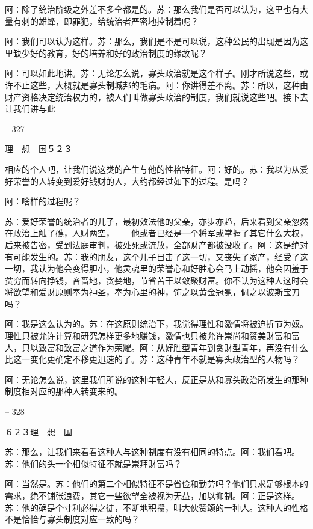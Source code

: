 \documentclass[11pt,oneside]{book}
\begin{document}
\begin{common-format}
    阿：除了统治阶级之外差不多全都是的。苏：那么我们是否可以认为，这里也有大量有刺的雄蜂，即罪犯，给统治者严密地控制着呢？

    阿：我们可以认为这样。苏：那么，我们是不是可以说，这种公民的出现是因为这里缺少好的教育，好的培养和好的政治制度的缘故呢？

    阿：可以如此地讲。苏：无论怎么说，寡头政治就是这个样子。刚才所说这些，或许不止这些，大概就是寡头制城邦的毛病。阿：你讲得差不离。苏：所以，这种由财产资格决定统治权力的，被人们叫做寡头政治的制度，我们就说这些吧。接下去让我们讲与此

    

-- 327

    理　想　国５２３

    相应的个人吧，让我们说这类的产生与他的性格特征。阿：好的。苏：我以为从爱好荣誉的人转变到爱好钱财的人，大约都经过如下的过程。是吗？

    阿：啥样的过程呢？

    苏：爱好荣誉的统治者的儿子，最初效法他的父亲，亦步亦趋，后来看到父亲忽然在政治上触了礁，人财两空，——他或者已经是一个将军或掌握了其它什么大权，后来被告密，受到法庭审判，被处死或流放，全部财产都被没收了。阿：这是绝对有可能发生的。苏：我的朋友，这个儿子目击了这一切，又丧失了家产，经受了这一切，我认为他会变得胆小，他灵魂里的荣誉心和好胜心会马上动摇，他会因羞于贫穷而转向挣钱，吝啬地，贪婪地，节省苦干以敛聚财富。你不认为这种人这时会将欲望和爱财原则奉为神圣，奉为心里的神，饰之以黄金冠冕，佩之以波斯宝刀吗？

    阿：我是这么认为的。苏：在这原则统治下，我觉得理性和激情将被迫折节为奴。理性只被允许计算和研究怎样更多地赚钱，激情也只被允许崇尚和赞美财富和富人，只以致富和致富之道作为荣耀。阿：从好胜型青年到贪财型青年，再没有什么比这一变化更确定不移更迅速的了。苏：这种青年不就是寡头政治型的人物吗？

    阿：无论怎么说，这里我们所说的这种年轻人，反正是从和寡头政治所发生的那种制度相对应的那种人转变来的。

    

-- 328

    ６２３理　想　国

    苏：那么，让我们来看看这种人与这种制度有没有相同的特点。阿：我们看吧。苏：他们的头一个相似特征不就是崇拜财富吗？

    阿：当然是。苏：他们的第二个相似特征不是省俭和勤劳吗？他们只求足够根本的需求，绝不铺张浪费，其它一些欲望全被视为无益，加以抑制。阿：正是这样。苏：他的确是个寸利必得之徒，不断地积攒，叫大伙赞颂的一种人。这种人的性格不是恰恰与寡头制度对应一致的吗？


\end{common-format}
\end{document}
